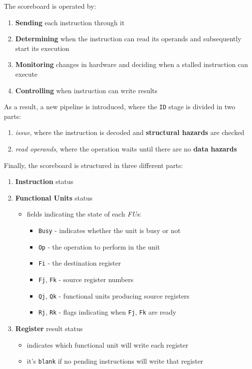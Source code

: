 \documentclass[english]{article}
\begin{document}
\bigskip
The scoreboard is operated by:

\begin{enumerate}
  \item \textbf{Sending} each instruction through it
  \item \textbf{Determining} when the instruction can read its operands and subsequently start its execution
  \item \textbf{Monitoring} changes in hardware and deciding when a stalled instruction can execute
  \item \textbf{Controlling} when instruction can write results
\end{enumerate}

As a result, a new pipeline is introduced, where the \texttt{ID} stage is divided in two parts:
\begin{enumerate}
  \item \textit{issue}, where the instruction is decoded and \textbf{structural hazards} are checked
  \item \textit{read operands}, where the operation waits until there are no \textbf{data hazards}
\end{enumerate}

Finally, the scoreboard is structured in three different parts:
\begin{enumerate}
  \item \textbf{Instruction} status
  \item \textbf{Functional Units} status
        \begin{itemize}
          \item fields indicating the state of each \textit{FUs}:
                \begin{itemize}
                  \item \texttt{Busy} - indicates whether the unit is busy or not
                  \item \texttt{Op} - the operation to perform in the unit
                  \item \texttt{Fi} - the destination register
                  \item \texttt{Fj}, \texttt{Fk} - source register numbers
                  \item \texttt{Qj}, \texttt{Qk} - functional units producing source registers
                  \item \texttt{Rj}, \texttt{Rk} - flags indicating when \texttt{Fj}, \texttt{Fk} are ready
                \end{itemize}
        \end{itemize}
  \item \textbf{Register} result status
        \begin{itemize}
          \item indicates which functional unit will write each register
          \item it's \texttt{blank} if no pending instructions will write that register
        \end{itemize}
\end{enumerate}
\end{document}
